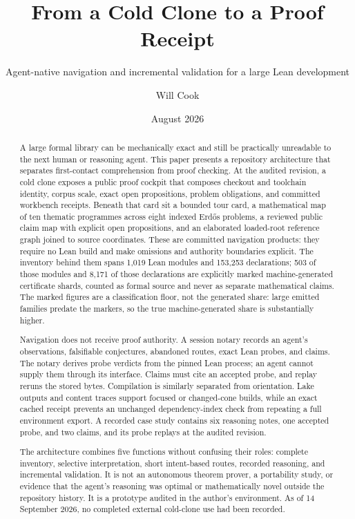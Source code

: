 \documentclass[11pt]{article}
\title{From a Cold Clone to a Proof Receipt}
\subtitle{Agent-native navigation and incremental validation for a large Lean development}
\author{Will Cook}
\date{August 2026}
\begin{document}
\maketitle
\paperprovenance

\begin{abstract}
A large formal library can be mechanically exact and still be practically
unreadable to the next human or reasoning agent. This paper presents a
repository architecture that separates first-contact comprehension from proof
checking. At the audited revision, a cold clone exposes a public proof cockpit
that composes checkout and toolchain identity, corpus scale, exact open
propositions, problem obligations, and committed workbench receipts. Beneath
that card sit a bounded tour card, a mathematical map of ten thematic
programmes across eight indexed Erd\H{o}s problems, a
reviewed public claim map with explicit open propositions, and an
elaborated loaded-root reference graph joined to source coordinates. These are
committed navigation products: they require no Lean build and make omissions
and authority boundaries explicit.
The inventory behind them spans 1,019 Lean modules and 153,253 declarations;
503 of those modules and 8,171 of those declarations are explicitly marked
machine-generated certificate shards, counted as formal source and never as
separate mathematical claims.  The marked figures are a classification
floor, not the generated share: large emitted families predate the markers,
so the true machine-generated share is substantially higher.

Navigation does not receive proof authority. A session notary records an
agent's observations, falsifiable conjectures, abandoned routes, exact Lean
probes, and claims. The notary derives probe verdicts from the pinned Lean
process; an agent cannot supply them through its interface. Claims must cite
an accepted probe, and replay reruns
the stored bytes. Compilation is similarly separated from orientation. Lake
outputs and content traces support focused or changed-cone builds, while an
exact cached receipt prevents an unchanged dependency-index check from
repeating a full environment export. A recorded case study contains six reasoning
notes, one accepted probe, and two claims, and its probe replays at the audited
revision.

The architecture combines five functions without confusing their roles:
complete inventory, selective interpretation, short intent-based routes,
recorded reasoning, and incremental validation. It is not an autonomous theorem
prover, a portability study, or evidence that the agent's reasoning was optimal
or mathematically novel outside the repository history. It is a prototype
audited in the author's environment. As of 14 September 2026, no completed
external cold-clone use had been recorded.
\end{abstract}
\end{document}
